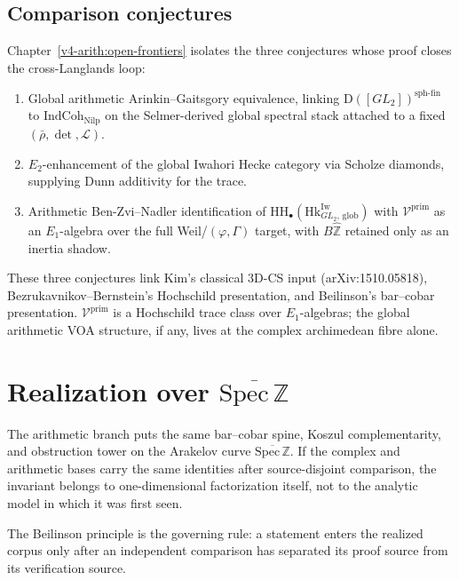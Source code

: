 \subsection*{Comparison conjectures}

Chapter~\ref{v4-arith:open-frontiers} isolates the three
conjectures whose proof closes the cross-Langlands loop:

\begin{enumerate}
\item Global arithmetic Arinkin--Gaitsgory equivalence, linking
\(\mathrm{D}([GL_{2}])^{\mathrm{sph\text{-}fin}}\) to
\(\mathrm{IndCoh}_{\mathrm{Nilp}}\) on the Selmer-derived global
spectral stack attached to a fixed \((\bar\rho,\det,\mathcal{L})\).
\item \(E_{2}\)-enhancement of the global Iwahori Hecke category via
Scholze diamonds, supplying Dunn additivity for the trace.
\item Arithmetic Ben-Zvi--Nadler identification of
\(\mathrm{HH}_{\bullet}(\mathrm{Hk}^{\mathrm{Iw}}_{GL_{2},\,\mathrm{glob}})\)
with \(\mathcal{V}^{\mathrm{prim}}\) as an \(E_{1}\)-algebra over the
full Weil/\((\varphi,\Gamma)\) target, with \(B\widehat{\mathbb{Z}}\)
retained only as an inertia shadow.
\end{enumerate}

These three conjectures link Kim's classical 3D-CS input
(arXiv:1510.05818), Bezrukavnikov--Bernstein's Hochschild
presentation, and Beilinson's bar--cobar presentation.
\(\mathcal{V}^{\mathrm{prim}}\) is a Hochschild trace class
over \(E_1\)-algebras; the global arithmetic VOA structure, if
any, lives at the complex archimedean fibre alone.

\section{Realization over \texorpdfstring{\(\overline{\mathrm{Spec}\,\mathbb{Z}}\)}{Spec Z bar}}
\label{v4-arith:manifesto:role}

The arithmetic branch puts the same bar--cobar spine, Koszul
complementarity, and obstruction tower on the Arakelov curve
\(\overline{\mathrm{Spec}\,\mathbb{Z}}\). If the complex and
arithmetic bases carry the same identities after source-disjoint
comparison, the invariant belongs to one-dimensional factorization
itself, not to the analytic model in which it was first seen.

The Beilinson principle is the governing rule: a statement enters the
realized corpus only after an independent comparison has separated its
proof source from its verification source.

